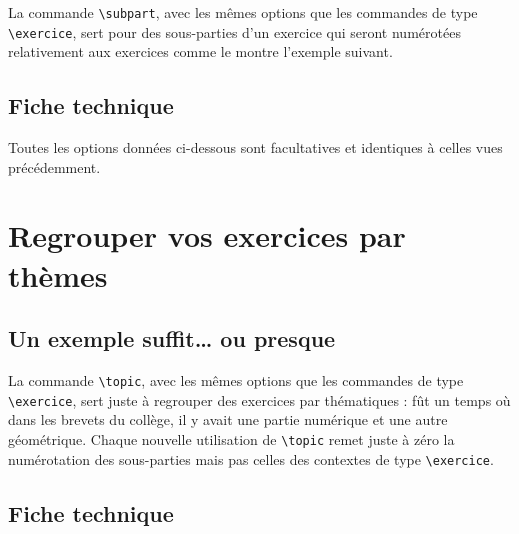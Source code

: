\documentclass[12pt,a4paper]{scrartcl}
\makeatletter
\theoremstyle{definition}
\newcommand\resetallcnt{
		\setcounter{lyxam@counter@topic}{0}
		\setcounter{lyxam@counter@exercise}{0}
		\setcounter{lyxam@counter@problem}{0}
		\setcounter{lyxam@counter@bonus}{0}
		\setcounter{lyxam@counter@subpart}{0}
	}
\newcommand\IDmacro{\@ifstar{\@IDmacroStar}{\@IDmacroNoStar}}
\newcommand\@IDmacroNoStar[3]{%
        \texttt{%
        	\textbackslash#1%
        	\IfStrEq{#2}{0}{}{%
        		\,\,[#2 Option%
				\IfStrEq{#2}{1}{}{s}]%
			}%
    	    \IfStrEq{#3}{}{}{%
	    		\,\,(#3 Argument%
				\IfStrEq{#3}{1}{}{s})%
			}
	   	}
        \immediate\write\tempfile{macro@#1@#2@#3}%
    }
\newcommand\@IDmacroStar[2]{%
        \@IDmacroNoStar{#1}{0}{#2}%
    }
\makeatother
\begin{document}
La commande \verb+\subpart+, avec les mêmes options que les commandes de type \verb+\exercice+, sert pour des sous-parties d'un exercice qui seront numérotées relativement aux exercices comme le montre l'exemple suivant.

\resetallcnt{}

\begin{tcblisting}{}
\exercise
\subpart
\subpart

\exercise
\subpart
\subpart
\end{tcblisting}


    \subsection{Fiche technique}

Toutes les options données ci-dessous sont facultatives et identiques à celles vues précédemment.

\bigskip


\IDmacro{subpart}{6}{}

\exosoptions{}



\section{Regrouper vos exercices par thèmes}

    \subsection{Un exemple suffit\dots{} ou presque}

La commande \verb+\topic+, avec les mêmes options que les commandes de type \verb+\exercice+, sert juste à regrouper des exercices par thématiques : fût un temps où dans les brevets du collège, il y avait une partie numérique et une autre géométrique.
Chaque nouvelle utilisation de \verb+\topic+ remet juste à zéro la numérotation des sous-parties mais pas celles des contextes de type \verb+\exercice+.

\resetallcnt{}

\resetallcnt{}

\begin{tcblisting}{}
\topic
\exercise
\exercise

\topic
\exercise
\end{tcblisting}


    \subsection{Fiche technique}
\end{document}
